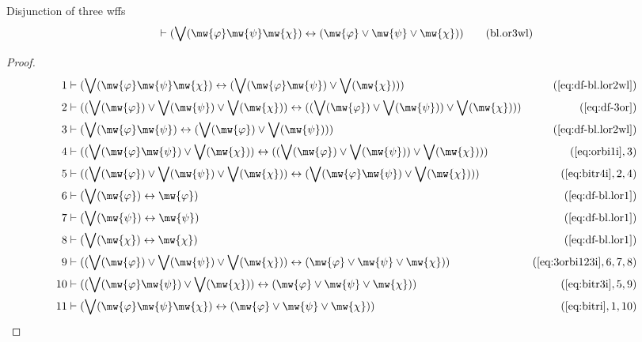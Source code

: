 \begin{lemma} Disjunction of three wffs
\begin{align}
\vdash ( \bigvee( \mw{\varphi} \mw{\psi} \mw{\chi} ) \leftrightarrow ( \mw{\varphi} \vee \mw{\psi} \vee
    \mw{\chi} ) )\label{eq:bl.or3wl}\tag{bl.or3wl}
\end{align}
\end{lemma}

\begin{proof}
\begin{align}
  1 & \vdash ( \bigvee( \mw{\varphi} \mw{\psi} \mw{\chi} ) \leftrightarrow ( \bigvee(
    \mw{\varphi} \mw{\psi} ) \vee \bigvee( \mw{\chi} ) )
    )&(\mbox{\ref{eq:df-bl.lor2wl}})\notag
  \\ 2 & \vdash ( ( \bigvee( \mw{\varphi} ) \vee \bigvee( \mw{\psi} ) \vee \bigvee(
    \mw{\chi} ) ) \leftrightarrow ( ( \bigvee( \mw{\varphi} ) \vee
    \bigvee( \mw{\psi} ) ) \vee \bigvee( \mw{\chi} ) )
    )&(\mbox{\ref{eq:df-3or}})\notag
  \\ 3 & \vdash ( \bigvee( \mw{\varphi} \mw{\psi} ) \leftrightarrow ( \bigvee(
    \mw{\varphi} ) \vee \bigvee( \mw{\psi} ) )
    )&(\mbox{\ref{eq:df-bl.lor2wl}})\notag
  \\ 4 & \vdash ( ( \bigvee( \mw{\varphi} \mw{\psi} ) \vee \bigvee( \mw{\chi} ) )
    \leftrightarrow ( ( \bigvee( \mw{\varphi} ) \vee \bigvee(
    \mw{\psi} ) ) \vee \bigvee( \mw{\chi} ) )
    )&(\mbox{\ref{eq:orbi1i}},3)\notag
  \\ 5 & \vdash ( ( \bigvee( \mw{\varphi} ) \vee \bigvee( \mw{\psi} ) \vee \bigvee(
    \mw{\chi} ) ) \leftrightarrow ( \bigvee( \mw{\varphi} \mw{\psi} )
    \vee \bigvee( \mw{\chi} ) )
    )&(\mbox{\ref{eq:bitr4i}},2,4)\notag
  \\ 6 & \vdash ( \bigvee( \mw{\varphi} ) \leftrightarrow \mw{\varphi}
    )&(\mbox{\ref{eq:df-bl.lor1}})\notag
  \\ 7 & \vdash ( \bigvee( \mw{\psi} ) \leftrightarrow \mw{\psi}
    )&(\mbox{\ref{eq:df-bl.lor1}})\notag
  \\ 8 & \vdash ( \bigvee( \mw{\chi} ) \leftrightarrow \mw{\chi}
    )&(\mbox{\ref{eq:df-bl.lor1}})\notag
  \\ 9 & \vdash ( ( \bigvee( \mw{\varphi} ) \vee \bigvee( \mw{\psi} ) \vee \bigvee(
    \mw{\chi} ) ) \leftrightarrow ( \mw{\varphi} \vee \mw{\psi} \vee
    \mw{\chi} ) )&(\mbox{\ref{eq:3orbi123i}},6,7,8)\notag
  \\ 10 & \vdash ( ( \bigvee( \mw{\varphi} \mw{\psi} ) \vee \bigvee( \mw{\chi} ) )
    \leftrightarrow ( \mw{\varphi} \vee \mw{\psi} \vee \mw{\chi} )
    )&(\mbox{\ref{eq:bitr3i}},5,9)\notag
  \\ 11 & \vdash ( \bigvee( \mw{\varphi} \mw{\psi} \mw{\chi} ) \leftrightarrow ( \mw{\varphi}
    \vee \mw{\psi} \vee \mw{\chi} )
    )&(\mbox{\ref{eq:bitri}},1,10)\notag
\end{align}
\end{proof}

